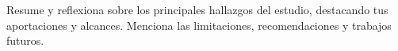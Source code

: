 Resume y reflexiona sobre los principales hallazgos del estudio, destacando tus aportaciones y alcances. Menciona las limitaciones, recomendaciones y trabajos futuros.